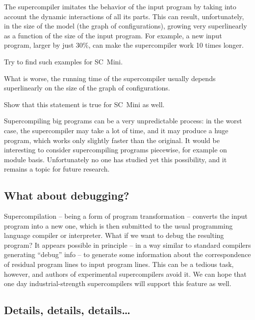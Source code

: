 The supercompiler imitates the behavior of the input program by taking into
account the dynamic interactions of all its parts.
This can result, unfortunately, in the size of the model (the graph of configurations),
growing very superlinearly as a function of the size of the input program.
For example, a new input program, larger by just 30\%, can make the
supercompiler work 10 times longer.

\begin{exercise}
Try to find such examples for SC~Mini.
\end{exercise}

What is worse, the running time of the supercompiler usually 
depends superlinearly on the size of the graph of configurations.

\begin{exercise}
Show that this statement is true for SC~Mini as well.
\end{exercise}

Supercompiling big programs can be a very unpredictable process:
in the worst case, the supercompiler may take a lot of time, and it may
produce a huge program, which works only slightly faster than the original.
It would be interesting to consider supercompiling
programs piecewise, for example on module basis.
Unfortunately no one has studied yet this possibility,
and it remains a topic for future research. 

\subsection{What about debugging?}

Supercompilation -- being a form of program transformation -- converts the
input program into a new one, which is then submitted to the usual
programming language compiler or interpreter.
What if we want to debug the resulting program?
It appears possible in principle -- in a way similar to
standard compilers generating ``debug'' info --
to generate some information about the correspondence of
residual program lines to input program lines.
This can be a tedious task, however, and
authors of experimental supercompilers avoid it.
We can hope that one day industrial-strength supercompilers
will support this feature as well.

\subsection{Details, details, details\ldots}

